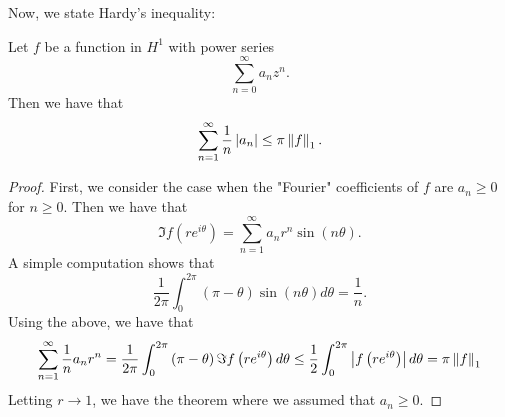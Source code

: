 Now, we state Hardy's inequality:

\begin{theorem}[Hardy]
    Let $f$ be a function in $H^{1}$ with power series
    \begin{equation*}
	\sum_{n=0}^{\infty} a_{n} z^{n}.
    \end{equation*}
    Then we have that
    \begin{equation*}
	\sum_{n=1}^{\infty} \frac{1}{n} \left\lvert a_{n} \right\rvert \le \pi \left\lVert f \right\rVert_{1}.
    \end{equation*}
    \label{thm:hardy-inequality}
\end{theorem}
\begin{proof}
    First, we consider the case when the "Fourier" coefficients of $f$ are $a_{n} \ge 0$ for $n\ge 0$. Then we have that 
    \begin{equation*}
	\Im f\left( re^{i\theta} \right) = \sum_{n=1}^{\infty} a_{n} r^{n} \sin \left( n\theta \right).
    \end{equation*}
    A simple computation shows that 
    \begin{equation*}
	\frac{1}{2\pi} \int_{0}^{2\pi} \left( \pi-\theta \right) \sin \left( n\theta \right) d\theta = \frac{1}{n}.
    \end{equation*}
    Using the above, we have that
    \begin{equation*}
	\sum_{n=1}^{\infty} \frac{1}{n}a_{n}r^{n} = \frac{1}{2\pi} \int_{0}^{2\pi} \left( \pi-\theta \right) \Im f\left( re^{i\theta} \right) d\theta \le \frac{1}{2} \int_{0}^{2\pi} \left\lvert f\left( re^{i\theta} \right) \right\rvert d\theta = \pi \left\lVert f \right\rVert_{1}
    \end{equation*}
    Letting $r \to 1$, we have the theorem where we assumed that $a_{n} \ge 0$.


\end{proof}
